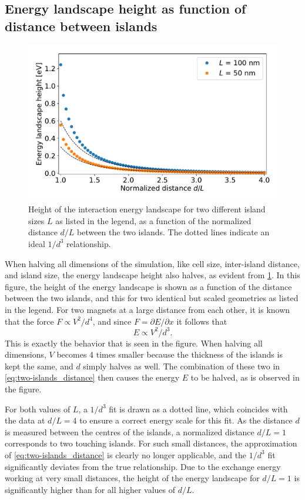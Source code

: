 \documentclass[11pt,a4paper,english]{article}
\begin{document}
\subsection{Energy landscape height as function of distance between islands}
\label{par:TwoIslands_EnergyHeight}
\begin{figure}
    \centering
    \includegraphics[width=0.8\columnwidth]{Figures/two_islands/EnergyBarrier/dist1-4L_r0.49_s100&50_4nm&2nm.pdf}
    \caption{Height of the interaction energy landscape for two different island sizes $L$ as listed in the legend, as a function of the normalized distance $d/L$ between the two islands. The dotted lines indicate an ideal $1/d^3$ relationship.}
    \label{fig:two-islands_barrier}
\end{figure}
When halving all dimensions of the simulation, like cell size, inter-island distance, and island size, the energy landscape height also halves, as evident from \cref{fig:two-islands_barrier}. In this figure, the height of the energy landscape is shown as a function of the distance between the two islands, and this for two identical but scaled geometries as listed in the legend. For two magnets at a large distance from each other, it is known~\cite{MagnetForceDistance} that the force $F \propto V^2 / d^4$, and since $F=\partial E/\partial x$ it follows that
\begin{equation}
    E \propto V^2 / d^3 \mathrm{.}
    \label{eq:two-islands_distance}
\end{equation}
This is exactly the behavior that is seen in the figure. When halving all dimensions, $V$ becomes 4 times smaller because the thickness of the islands is kept the same, and $d$ simply halves as well. The combination of these two in \cref{eq:two-islands_distance} then causes the energy $E$ to be halved, as is observed in the figure. \par
For both values of $L$, a $1/d^3$ fit is drawn as a dotted line, which coincides with the data at $d/L=4$ to ensure a correct energy scale for this fit. As the distance $d$ is measured between the centres of the islands, a normalized distance $d/L=1$ corresponds to two touching islands. For such small distances, the approximation of \cref{eq:two-islands_distance} is clearly no longer applicable, and the $1/d^3$ fit significantly deviates from the true relationship. Due to the exchange energy working at very small distances, the height of the energy landscape for $d/L=1$ is significantly higher than for all higher values of $d/L$.
\end{document}
